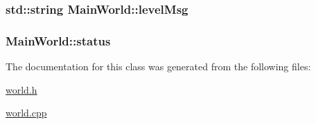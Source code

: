 \subsubsection[{level\+Msg}]{\setlength{\rightskip}{0pt plus 5cm}std\+::string Main\+World\+::level\+Msg\hspace{0.3cm}{\ttfamily [private]}}\label{classMainWorld_a0d1545c344c83a85d56597b8e582a6db}
\hypertarget{classMainWorld_a9769c3d0399e2d8a8176c0c21762b1eb}{}
\subsubsection[{status}]{ Main\+World\+::status\hspace{0.3cm}{\ttfamily [private]}}\label{classMainWorld_a9769c3d0399e2d8a8176c0c21762b1eb}


The documentation for this class was generated from the following files\+:\begin{DoxyCompactItemize}
\item 
\hyperlink{world_8h}{world.\+h}\item 
\hyperlink{world_8cpp}{world.\+cpp}\end{DoxyCompactItemize}
